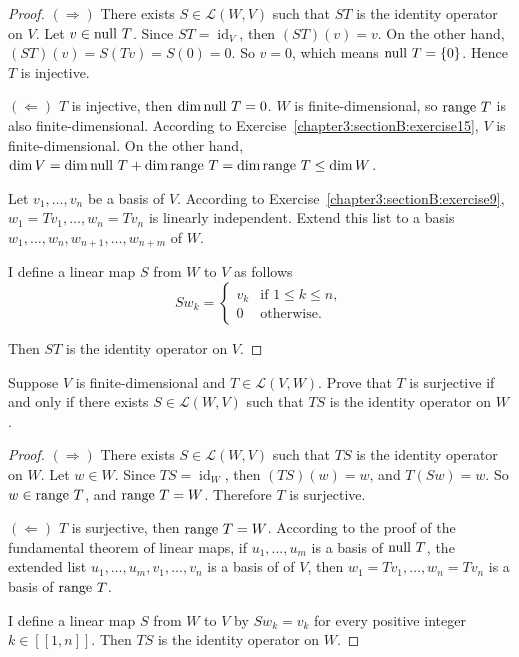 \begin{proof}
    $(\Rightarrow)$ There exists $S\in\mathcal{L}(W, V)$ such that $ST$ is the identity operator on $V$. Let $v\in\operatorname{null}\,{T}$. Since $ST = \operatorname{id}_{V}$, then $(ST)(v) = v$. On the other hand, $(ST)(v) = S(Tv) = S(0) = 0$. So $v = 0$, which means $\operatorname{null}\,{T} = \{0\}$. Hence $T$ is injective.

    $(\Leftarrow)$ $T$ is injective, then $\dim\operatorname{null}\,{T} = 0$. $W$ is finite-dimensional, so $\operatorname{range}\,{T}$ is also finite-dimensional. According to Exercise~\ref{chapter3:sectionB:exercise15}, $V$ is finite-dimensional. On the other hand, $\dim V = \dim\operatorname{null}\,{T} + \dim\operatorname{range}\,{T} = \dim\operatorname{range}\,{T}\leq \dim W$.

    Let $v_{1}, \ldots, v_{n}$ be a basis of $V$. According to Exercise~\ref{chapter3:sectionB:exercise9}, $w_{1} = Tv_{1}, \ldots, w_{n} = Tv_{n}$ is linearly independent. Extend this list to a basis $w_{1}, \ldots, w_{n}, w_{n+1}, \ldots, w_{n+m}$ of $W$.

    I define a linear map $S$ from $W$ to $V$ as follows
    \[
        Sw_{k} = \begin{cases}
            v_{k} & \text{if $1\leq k\leq n$}, \\
            0     & \text{otherwise}.
        \end{cases}
    \]

    Then $ST$ is the identity operator on $V$.
\end{proof}
\newpage

\begin{exercise}
    Suppose $V$ is finite-dimensional and $T\in\mathcal{L}(V, W)$. Prove that $T$ is surjective if and only if there exists $S\in\mathcal{L}(W, V)$ such that $TS$ is the identity operator on $W$.
\end{exercise}

\begin{proof}
    $(\Rightarrow)$ There exists $S\in\mathcal{L}(W, V)$ such that $TS$ is the identity operator on $W$. Let $w\in W$. Since $TS = \operatorname{id}_{W}$, then $(TS)(w) = w$, and $T(Sw) = w$. So $w\in \operatorname{range}\,{T}$, and $\operatorname{range}\,{T} = W$. Therefore $T$ is surjective.

    $(\Leftarrow)$ $T$ is surjective, then $\operatorname{range}\,{T} = W$. According to the proof of the fundamental theorem of linear maps, if $u_{1}, \ldots, u_{m}$ is a basis of $\operatorname{null}\,{T}$, the extended list $u_{1}, \ldots, u_{m}, v_{1}, \ldots, v_{n}$ is a basis of of $V$, then $w_{1} = Tv_{1}, \ldots, w_{n} = Tv_{n}$ is a basis of $\operatorname{range}\,{T}$.

    I define a linear map $S$ from $W$ to $V$ by $Sw_{k} = v_{k}$ for every positive integer $k\in[\![ 1, n ]\!]$. Then $TS$ is the identity operator on $W$.
\end{proof}
\newpage


